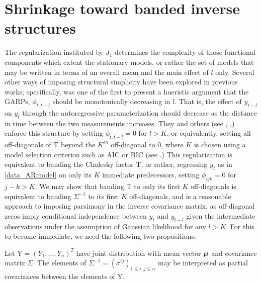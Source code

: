 \documentclass[12pt]{article}
\newcommand{\bfmu}{\mbox{\boldmath $\mu$}}
\newcommand{\bigY}{\mbox{Y}}
\newcommand{\matT}{\mbox{T}}
\newenvironment{proposition}[1][Proposition]{\begin{trivlist}
\item[\hskip \labelsep {\bfseries #1}]}{\end{trivlist}}
\begin{document}
\section{Shrinkage toward banded inverse structures}


The regularization instituted by $J_1$ determines the  complexity of those functional components which extent the stationary models, or rather the set of models that may be written in terms of an overall mean and the main effect of $l$ only. Several other ways of imposing structural simplicity have been explored in previous works; specifically, \cite{pourahmadi1999joint} was one of the first to present a hueristic argument that the GARPs, $\phi_{t,t-l}$ should be monotonically decreasing in $l$. That is, the effect of $y_{t-l}$ on $y_t$ through the autoregressive parameterization should decrease as the distance in time between the two measurements increases. They and others (see \cite{bickel2008regularized}, \cite{huang2007estimation},\cite{levina2008sparse}) enforce this structure by setting $\phi_{t,t-l}=0$ for $l > K$, or equivalently, setting all off-diagonals of $\matT$ beyond the $K^{th}$ off-diagonal to $0$, where $K$ is chosen using a model selection criterion such as AIC or BIC (see  \citet{wu2003nonparametric}.) This regularization is equivalent to banding the Cholesky factor $\matT$, or rather, regressing $y_t$ as in \eqref{data_ARmodel} on only its $K$ immediate predecessors, setting $\phi_{ijk} = 0$ for $j-k>K$. We may show that banding $\matT$ to only its first $K$ off-diagonals is equivalent to banding $\Sigma^{-1}$ to its first $K$ off-diagonals, and is a reasonable approach to imposing parsimony in the inverse covariance matrix, as off-diagonal zeros imply conditional independence between $y_t$ and $y_{t-l}$ given the intermediate observations under the assumption of Gaussian likelihood for any $l > K$. For this to become immediate, we need the following two propositions:

\begin{proposition}
Let $\bigY = \left(Y_1, \dots, Y_n\right)^T$ have joint distribution with mean vector $\bfmu$ and covariance matrix $\Sigma$. The elements of $\Sigma^{-1} = \left( \sigma^{ij} \right)_{1 \le i,j \le n}$ may be interpreted as partial covariances between the elements of $\bigY$.
\end{proposition}
\end{document}
